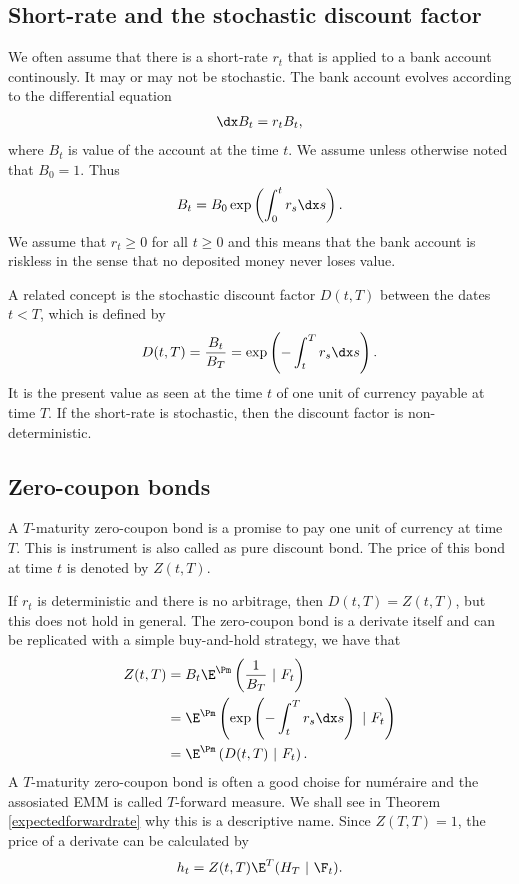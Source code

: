 \subsection{Short-rate and the stochastic discount factor}

We often assume that there is a short-rate $r_t$ that is applied to a bank account continously. It may or may not be stochastic. The bank account evolves according to the differential equation
  \begin{align}
    \dx B_t = r_t B_t,
  \end{align}
where $B_t$ is value of the account at the time $t$. We assume unless otherwise noted that $B_0 = 1$. Thus
  \begin{align}
    B_t = B_0 \exp \left( \int_0^t r_s \dx s \right) .
  \end{align}
We assume that $r_t \geq 0$ for all $t \geq 0$ and this means that the bank account is riskless in the sense that no deposited money never loses value.

A related concept is the stochastic discount factor $D(t,T)$ between the dates $t < T$, which is defined by
  \begin{align}
    D(t,T) = \frac{B_t}{B_T} = \exp \left( - \int_t^T r_s \dx s \right) .
  \end{align}
It is the present value as seen at the time $t$ of one unit of currency payable at time $T$. If the short-rate is stochastic, then the discount factor is non-deterministic. 

\subsection{Zero-coupon bonds}

A $T$-maturity zero-coupon bond is a promise to pay one unit of currency at time $T$. This is instrument is also called as pure discount bond. The price of this bond at time $t$ is denoted by $Z(t,T)$. 

If $r_t$ is deterministic and there is no arbitrage, then $D(t,T) = Z(t,T)$, but this does not hold in general. The zero-coupon bond is a derivate itself and can be replicated with a simple buy-and-hold strategy, we have that
  \begin{align}
    Z(t,T) &= B_t \E^{\Pm} \left( \frac{1}{B_T} \ | \ F_t \right) \\ 
      &= \E^{\Pm} \left( \exp \left( - \int_t^T r_s \dx s \right) \ | \ F_t \right) \\
      &= \E^{\Pm} \left( D(t,T) \ | \ F_t \right) .
  \end{align}
A $T$-maturity zero-coupon bond is often a good choise for num\'{e}raire and the assosiated EMM is called $T$-forward measure. We shall see in Theorem \ref{expectedforwardrate} why this is a descriptive name. Since $Z(T,T) = 1$, the price of a derivate can be calculated by
  \begin{align}
    h_t = Z(t,T) \E^T ( H_T \ | \ \F_t ).
  \end{align}

